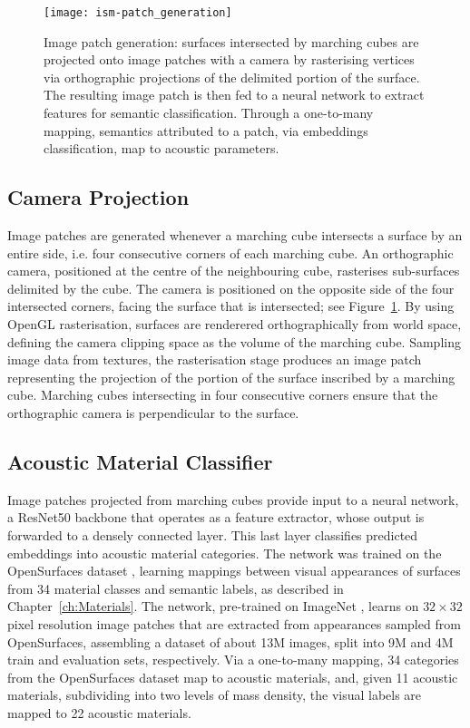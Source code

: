 \begin{figure}[htb]
    \centering 
    \texttt{[image: ism-patch\_generation]}
    \caption{Image patch generation: surfaces intersected by marching cubes are projected onto image patches with a camera by rasterising vertices via orthographic projections of the delimited portion of the surface. The resulting image patch is then fed to a neural network to extract features for semantic classification. Through a one-to-many mapping, semantics attributed to a patch, via embeddings classification, map to acoustic parameters.}
\label{fig:ism-patch_generation}
\end{figure}

\subsection{Camera Projection}
Image patches are generated whenever a marching cube intersects a surface by an entire side, i.e. four consecutive corners of each marching cube. An orthographic camera, positioned at the centre of the neighbouring cube, rasterises sub-surfaces delimited by the cube. The camera is positioned on the opposite side of the four intersected corners, facing the surface that is intersected; see Figure~\ref{fig:ism-patch_generation}. 
By using OpenGL rasterisation, surfaces are renderered orthographically from world space, defining the camera clipping space as the volume of the marching cube. Sampling image data from textures, the rasterisation stage produces an image patch representing the projection of the portion of the surface inscribed by a marching cube. Marching cubes intersecting in four consecutive corners ensure that the orthographic camera is perpendicular to the surface.\par

\subsection{Acoustic Material Classifier}
Image patches projected from marching cubes provide input to a neural network, a ResNet50 \citep{he2016deep} backbone that operates as a feature extractor, whose output is forwarded to a densely connected layer. This last layer classifies predicted embeddings into acoustic material categories. The network was trained on the OpenSurfaces dataset \citep{bell2013opensurfaces}, learning mappings between visual appearances of surfaces from 34 material classes and semantic labels, as described in Chapter~\ref{ch:Materials}. The network, pre-trained on ImageNet \citep{deng2009imagenet}, learns on $32\times32$ pixel resolution image patches that are extracted from appearances sampled from OpenSurfaces, assembling a dataset of about 13M images, split into 9M and 4M train and evaluation sets, respectively. Via a one-to-many mapping, 34 categories from the OpenSurfaces dataset map to acoustic materials, and, given 11 acoustic materials, subdividing into two levels of mass density, the visual labels are mapped to 22 acoustic materials.\par

